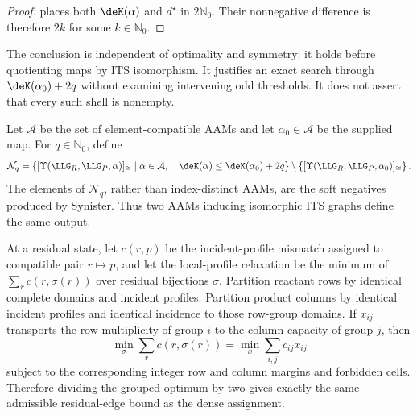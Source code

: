 \begin{proof}
 places both \(\deK(\alpha)\) and \(d^\star\) in
\(2\mathbb N_0\).  Their nonnegative difference is therefore \(2k\) for some
\(k\in\mathbb N_0\).
\end{proof}

The conclusion is independent of optimality and symmetry: it holds before
quotienting maps by ITS isomorphism.  It justifies an exact search through
\(\deK(\alpha_0)+2q\) without examining intervening odd thresholds.  It does
not assert that every such shell is nonempty.

\begin{definition}
\label{def:bounded-its-neighborhood}
Let \(\mathcal A\) be the set of element-compatible AAMs and let
\(\alpha_0\in\mathcal A\) be the supplied map.  For
\(q\in\mathbb N_0\), define
\begin{equation}
  \mathcal N_q
  =
  \left\{
    [\Upsilon(\LLG_R,\LLG_P,\alpha)]_{\cong}
    \;\middle|\;
    \alpha\in\mathcal A,\quad
    \deK(\alpha)\le
      \deK(\alpha_0)+2q
  \right\}
  \setminus
  \left\{[\Upsilon(\LLG_R,\LLG_P,\alpha_0)]_{\cong}\right\}.
  \label{eq:bounded-its-neighborhood}
\end{equation}
The elements of $\mathcal N_q$, rather than index-distinct AAMs, are the soft
negatives produced by Synister.  Thus two AAMs inducing isomorphic ITS graphs
define the same output.
\end{definition}

\begin{proposition}
\label{prop:grouped-local-profile}
At a residual state, let $c(r,p)$ be the incident-profile mismatch assigned to
compatible pair $r\mapsto p$, and let the local-profile relaxation be the
minimum of $\sum_r c(r,\sigma(r))$ over residual bijections $\sigma$.  Partition
reactant rows by identical complete domains and incident profiles.  Partition
product columns by identical incident profiles and identical incidence to
those row-group domains.  If $x_{ij}$ transports the row multiplicity of group
$i$ to the column capacity of group $j$, then
\[
  \min_\sigma\sum_r c(r,\sigma(r))
  =
  \min_x\sum_{i,j}c_{ij}x_{ij}
\]
subject to the corresponding integer row and column margins and forbidden
cells.  Therefore dividing the grouped optimum by two gives exactly the same
admissible residual-edge bound as the dense assignment.
\end{proposition}

